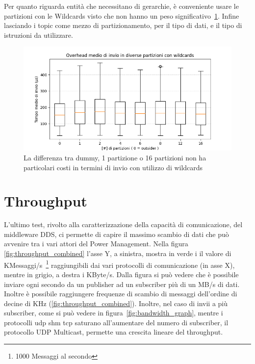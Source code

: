 Per quanto riguarda entità che necessitano di gerarchie, è conveniente usare le partizioni con le Wildcards visto che non hanno un peso significativo~\ref{fig:test2wildcards}. Infine lasciando i topic come mezzo di partizionamento, per il tipo di dati, e il tipo di istruzioni da utilizzare.

\begin{figure}[H]
    \centering
    \includegraphics[width=\textwidth]{./results/test2_wildcards.png}
    \caption{La differenza tra dummy, 1 partizione o 16 partizioni non ha particolari costi in termini di invio con utilizzo di wildcards}\label{fig:test2wildcards}
\end{figure}



\section{Throughput} %
L'ultimo test, rivolto alla caratterizzazione della capacità di comunicazione, del middleware DDS, ci permette di capire il massimo scambio di dati che può avvenire tra i vari attori del Power Management. Nella figura \ref{fig:throughput_combined} l'asse Y, a sinistra, mostra in verde i il valore di KMessaggi/s~\footnote{1000 Messaggi al secondo} raggiungibili dai vari protocolli di comunicazione (in asse X), mentre in grigio, a destra i KByte/s. Dalla figura si può vedere che è possibile inviare ogni secondo da un publisher ad un subscriber più di un MB/s di dati. Inoltre è possibile raggiungere frequenze di scambio di messaggi dell'ordine di decine di KHz (\ref{fig:throughput_combined}). Inoltre, nel caso di invii a più subscriber, come si può vedere in figura~\ref{fig:bandwidth_graph}, mentre i protocolli udp shm tcp saturano all'aumentare del numero di subscriber, il protocollo UDP Multicast, permette una crescita lineare del throughput.

